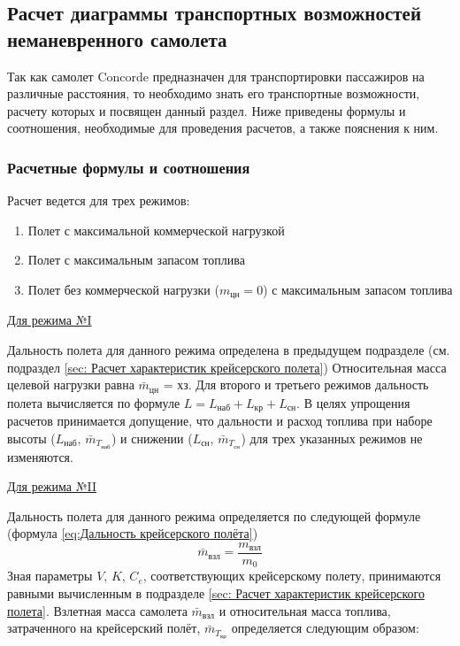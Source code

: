 \subsection{Расчет диаграммы транспортных возможностей неманевренного
самолета}
\label{sec:Расчет диаграммы транспортных возможностей неманевренного
самолета}

\pagestyle{fancy}
\fancyhf{}
\rfoot{\thepage}

Так как самолет Concorde предназначен для транспортировки пассажиров на различные расстояния, то необходимо знать его транспортные возможности, расчету которых и посвящен данный раздел. Ниже приведены формулы и соотношения, необходимые для проведения расчетов, а также пояснения к ним. 

\subsubsection{Расчетные формулы и соотношения}

Расчет ведется для трех режимов: 

\begin{enumerate}
    \item Полет с максимальной коммерческой нагрузкой
    \item Полет с максимальным запасом топлива
    \item Полет без коммерческой нагрузки ($m_\text{цн} = 0$) с максимальным запасом топлива
\end{enumerate}

\underline{Для режима №I} 

Дальность полета для данного режима определена в предыдущем подразделе (см. подраздел \ref{sec: Расчет характеристик крейсерского полета}) Относительная масса целевой нагрузки равна $\bar{m}_\text{цн}$ = хз. Для второго и третьего режимов дальность полета вычисляется по формуле $L = L_\text{наб} + L_\text{кр} + L_\text{сн}$. В целях упрощения расчетов принимается допущение, что дальности и расход топлива при наборе высоты ($L_\text{наб}$, $\bar{m}_{T_\text{наб}}$) и снижении ($L_\text{сн}$, $\bar{m}_{T_\text{сн}}$) для трех указанных режимов не изменяются. 

\underline{Для режима №II} 

Дальность полета для данного режима определяется по следующей формуле
(формула \ref{eq:Дальность крейсерского полёта})
$$\bar{m}_\text{взл} = \frac{m_\text{взл}}{m_0}$$
Зная параметры $V$, $K$, $C_e$, соответствующих крейсерскому
полету, принимаются равными вычисленным в подразделе \ref{sec: Расчет характеристик крейсерского полета}. Взлетная масса самолета $\bar{m}_\text{взл}$ и относительная масса топлива, затраченного на крейсерский полёт, $\bar{m}_{T_\text{кр}}$ определяется следующим образом:

